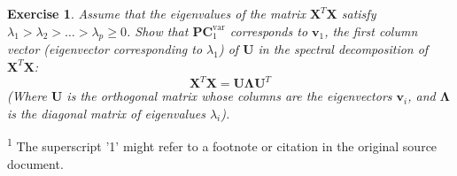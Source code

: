 \documentclass{article}
\renewcommand{\vec}[1]{\mathbf{#1}} %
\newcommand{\mat}[1]{\mathbf{#1}} %
\newtheorem*{exercise}{Exercise} %
\begin{document}
\vspace{1em} %

\begin{exercise}
Assume that the eigenvalues of the matrix $\mat{X}^T \mat{X}$ satisfy $\lambda_1 > \lambda_2 > \dots > \lambda_p \ge 0$. Show that $\vec{PC}_1^{\text{var}}$ corresponds to $\vec{v}_1$, the first column vector (eigenvector corresponding to $\lambda_1$) of $\mat{U}$ in the spectral decomposition of $\mat{X}^T \mat{X}$:
\[
\mat{X}^T \mat{X} = \mat{U} \mat{\Lambda} \mat{U}^T
\]
(Where $\mat{U}$ is the orthogonal matrix whose columns are the eigenvectors $\vec{v}_i$, and $\mat{\Lambda}$ is the diagonal matrix of eigenvalues $\lambda_i$).
\end{exercise}

\vspace{1em}
{\footnotesize \textsuperscript{1} The superscript '1' might refer to a footnote or citation in the original source document.}
\end{document}
